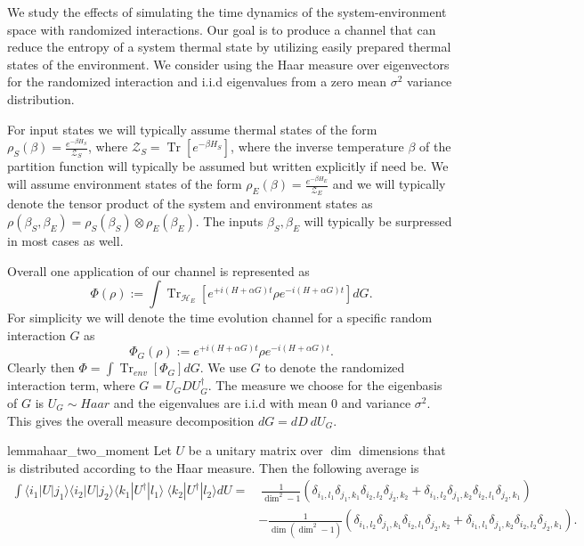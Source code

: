 \documentclass{article}
\newcommand{\ket}[1]{|#1\rangle}
\newcommand{\bra}[1]{\langle #1|}
\newcommand{\parens}[1]{\left( #1 \right)}
\newcommand{\brackets}[1]{\left[ #1 \right]}
\DeclareMathOperator{\Tr}{Tr}
\newcommand{\trace}[1]{\Tr \brackets{ #1 }}
\newcommand{\partrace}[2]{\Tr_{#1} \brackets{ #2 }}
\newcommand{\hilb}{\mathcal{H}}
\newcommand{\partfun}{\mathcal{Z}}
\begin{document}
We study the effects of simulating the time dynamics of the system-environment space with randomized interactions. Our goal is to produce a channel that can reduce the entropy of a system thermal state by utilizing easily prepared thermal states of the environment. We consider using the Haar measure over eigenvectors for the randomized interaction and i.i.d eigenvalues from a zero mean $\sigma^2$ variance distribution. 

For input states we will typically assume thermal states of the form $\rho_S(\beta) = \frac{e^{-\beta H_S}}{\partfun_S}$, where $\partfun_S = \trace{e^{-\beta H_S}}$, where the inverse temperature $\beta$ of the partition function will typically be assumed but written explicitly if need be. We will assume environment states of the form $\rho_E(\beta) = \frac{e^{-\beta H_E}}{\partfun_E}$ and we will typically denote the tensor product of the system and environment states as $\rho(\beta_S, \beta_E) = \rho_S(\beta_S) \otimes \rho_E(\beta_E)$. The inputs $\beta_S, \beta_E$ will typically be surpressed in most cases as well.


Overall one application of our channel is represented as
\begin{equation}
    \Phi(\rho) := \int \partrace{\hilb_E}{e^{+i(H + \alpha G)t} \rho e^{-i(H + \alpha G) t}} dG.
\end{equation}
For simplicity we will denote the time evolution channel for a specific random interaction $G$ as
\begin{equation}
    \Phi_G(\rho) := e^{+i (H+ \alpha G) t} \rho e^{-i (H + \alpha G) t}. \label{eq:phi_g_definition}
\end{equation}
Clearly then $\Phi = \int \partrace{env}{\Phi_G} dG$. We use $G$ to denote the randomized interaction term, where $G = U_G D U_G^\dagger$. The measure we choose for the eigenbasis of $G$ is $U_G \sim Haar$ and the eigenvalues are i.i.d with mean 0 and variance $\sigma^2$. This gives the overall measure decomposition $dG = dD ~ dU_G$. 

\begin{restatable}{lemma}{haar_two_moment} \label{lem:haar_two_moment}
    Let $U$ be a unitary matrix over $\dim$ dimensions that is distributed according to the Haar measure. Then the following average is
    \begin{align}
        \int \bra{i_1} U \ket{j_1} \bra{i_2} U \ket{j_2} \bra{k_1} U^\dagger \ket{l_1} ~ \bra{k_2} U^\dagger \ket{l_2} dU =& ~\frac{1}{\dim^2 - 1} \parens{\delta_{i_1, l_1} \delta_{j_1, k_1} \delta_{i_2, l_2} \delta_{j_2, k_2} + \delta_{i_1, l_2} \delta_{j_1, k_2} \delta_{i_2, l_1} \delta_{j_2, k_1}} \nonumber \\
        &- \frac{1}{\dim(\dim^2 - 1)} \parens{\delta_{i_1, l_2} \delta_{j_1, k_1} \delta_{i_2, l_1} \delta_{j_2, k_2} + \delta_{i_1, l_1} \delta_{j_1, k_2} \delta_{i_2, l_2} \delta_{j_2, k_1}}. \label{eq:haar_two_moment_integral}
    \end{align}
    \end{restatable}
\end{document}
